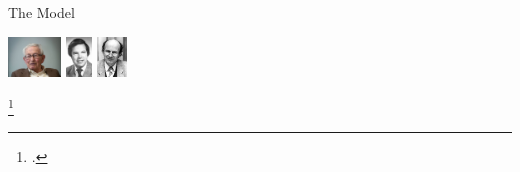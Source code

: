 \documentclass[aspectratio=169]{beamer}
\begin{document}
\begin{frame}[noframenumbering]{The Model}
{\begin{minipage}{0.3\textwidth}
	
	\vspace*{30pt}
	\includegraphics[height=30pt]{figures/pwanderson.jpg}
	\hspace*{\fill}
	\includegraphics[height=30pt]{figures/kgwilson.jpg}
	\hspace*{\fill}
	\includegraphics[height=30pt]{figures/nozieres.jpg}
\end{minipage}
\footcite{anderson1969exact,anderson1970,wilson1975,andreiKondoreview,andrei_kondo,wiegmann_kondoexact_1981,nozieres1974fermi}
}
\end{frame}
\end{document}
